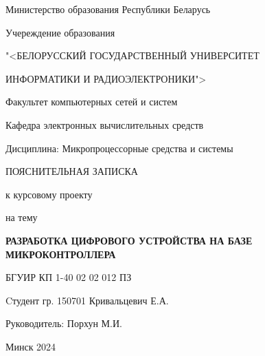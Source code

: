 \begin{centering}
  Министерство образования Республики Беларусь \par
   \bigskip
   Учереждение образования\par
   "<БЕЛОРУССКИЙ ГОСУДАРСТВЕННЫЙ УНИВЕРСИТЕТ \par
   ИНФОРМАТИКИ И РАДИОЭЛЕКТРОНИКИ">\par
   \bigskip \bigskip
\end{centering}

Факультет компьютерных сетей и систем\par\bigskip
Кафедра электронных вычислительных средств\par\bigskip
Дисциплина: Микропроцессорные средства и системы\par

\bigskip \bigskip \bigskip \bigskip \bigskip \bigskip 

\begin{centering}
   ПОЯСНИТЕЛЬНАЯ ЗАПИСКА \par
   к курсовому проекту\par
   на тему\par
   \bf{РАЗРАБОТКА ЦИФРОВОГО УСТРОЙСТВА НА БАЗЕ МИКРОКОНТРОЛЛЕРА}\normalfont\par
   БГУИР КП 1-40 02 02 012 ПЗ\par
\end{centering}
\bigskip \bigskip \bigskip \bigskip \bigskip \bigskip \bigskip \bigskip
\hspace*{70 mm}Cтудент гр. 150701 Кривальцевич Е.А.\par\bigskip\bigskip
\hspace*{70 mm}Руководитель: Порхун М.И.\par
\vfill \vfill 

\centerline{Минск 2024} 
\pagestyle{empty}